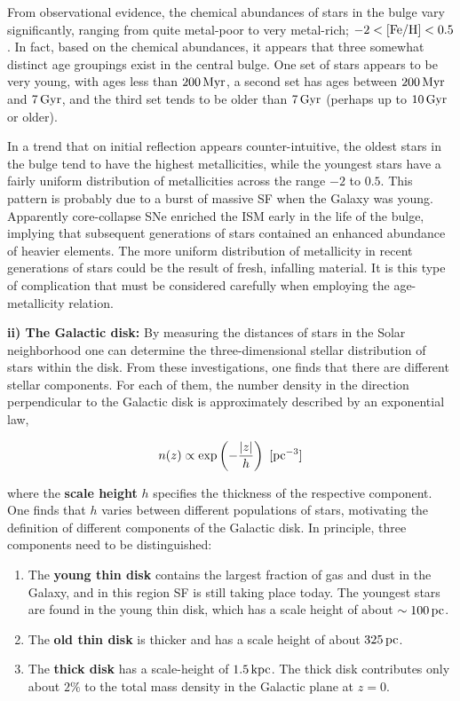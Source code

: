\documentclass[a4paper,10pt]{article}
\begin{document}
{\noindent}From observational evidence, the chemical abundances of stars in the bulge vary significantly, ranging from quite metal-poor to very metal-rich; $-2<[{\rm Fe/H}]<0.5$. In fact, based on the chemical abundances, it appears that three somewhat distinct age groupings exist in the central bulge. One set of stars appears to be very young, with ages less than $200\,{\rm Myr}$, a second set has ages between $200\,{\rm Myr}$ and $7\,{\rm Gyr}$, and the third set tends to be older than $7\,{\rm Gyr}$ (perhaps up to $10\,{\rm Gyr}$ or older).

{\noindent}In a trend that on initial reflection appears counter-intuitive, the oldest stars in the bulge tend to have the highest metallicities, while the youngest stars have a fairly uniform distribution of metallicities across the range $-2$ to $0.5$. This pattern is probably due to a burst of massive SF when the Galaxy was young. Apparently core-collapse SNe enriched the ISM early in the life of the bulge, implying that subsequent generations of stars contained an enhanced abundance of heavier elements. The more uniform distribution of metallicity in recent generations of stars could be the result of fresh, infalling material. It is this type of complication that must be considered carefully when employing the age-metallicity relation.

{\noindent}\textbf{ii) The Galactic disk:} By measuring the distances of stars in the Solar neighborhood one can determine the three-dimensional stellar distribution of stars within the disk. From these investigations, one finds that there are different stellar components. For each of them, the number density in the direction perpendicular to the Galactic disk is approximately described by an exponential law,

\begin{align*}
    n(z) \propto \exp \left(-\frac{|z|}{h}\right) ~ [{\rm pc^{-3}}]
\end{align*}

{\noindent}where the \textbf{scale height} $h$ specifies the thickness of the respective component. One finds that $h$ varies between different populations of stars, motivating the definition of different components of the Galactic disk. In principle, three components need to be distinguished:

\begin{enumerate}
    \item The \textbf{young thin disk} contains the largest fraction of gas and dust in the Galaxy, and in this region SF is still taking place today. The youngest stars are found in the young thin disk, which has a scale height of about $\sim100\,{\rm pc}$.
    \item The \textbf{old thin disk} is thicker and has a scale height of about $325\,{\rm pc}$.
    \item The \textbf{thick disk} has a scale-height of $1.5\,{\rm kpc}$. The thick disk contributes only about $2\%$ to the total mass density in the Galactic plane at $z=0$.
\end{enumerate}
\end{document}
